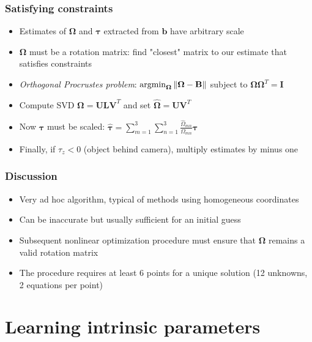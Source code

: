 \documentclass{beamer}
\begin{document}
\begin{frame}
  \frametitle{Satisfying constraints}
  \begin{itemize}[<+->]
    \item Estimates of $\boldsymbol{\Omega}$ and $\bm{\tau}$ extracted from
      $\mathbf{b}$ have arbitrary scale
    \item $\boldsymbol{\Omega}$ must be a rotation matrix: find "closest" matrix
      to our estimate that satisfies constraints
    \item \emph{Orthogonal Procrustes problem}:
      $\operatorname{argmin}_{\boldsymbol{\Omega}}
      \left\lVert\boldsymbol{\Omega}-\mathbf{B}\right\rVert$ subject to
      $\boldsymbol{\Omega\Omega}^T = \mathbf{I}$
    \item Compute SVD $\boldsymbol{\Omega} = \mathbf{ULV}^T$ and set
      $\boldsymbol{\hat{\Omega}} = \mathbf{UV}^T$
    \item Now $\bm{\tau}$ must be scaled:
      $\bm{\hat{\tau}} = \sum_{m=1}^3 \sum_{n=1}^3 \frac{\hat{\Omega}_{mn}}
      {\Omega_{mn}}\bm{\tau}$
    \item Finally, if $\tau_z < 0$ (object behind camera),
      multiply estimates by minus one
  \end{itemize}
\end{frame}

\begin{frame}
  \frametitle{Discussion}
  \begin{itemize}[<+->]
    \item Very ad hoc algorithm, typical of methods using homogeneous
      coordinates
    \item Can be inaccurate but usually sufficient for an initial guess
    \item Subsequent nonlinear optimization procedure must ensure that
      $\boldsymbol{\Omega}$ remains a valid rotation matrix
    \item The procedure requires at least 6 points for a unique solution (12
      unknowns, 2 equations per point)
  \end{itemize}
\end{frame}

\section{Learning intrinsic parameters}
\end{document}
